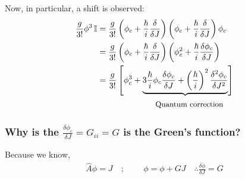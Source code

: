 \documentclass[14pt]{article} %
\begin{document}
Now, in particular, a shift is observed:
\begin{align*}
\frac{g}{3!} \phi^3 \, \mathbb{I}
&= \frac{g}{3!} \left( \phi_c + \frac{\hbar}{i} \frac{\delta}{\delta J} \right)
\left( \phi_c + \frac{\hbar}{i} \frac{\delta}{\delta J} \right) \phi_c
\\
&= \frac{g}{3!} \left( \phi_c + \frac{\hbar}{i} \frac{\delta}{\delta J} \right)
\left( \phi_c^2 + \frac{\hbar}{i} \frac{\delta \phi_c}{\delta J} \right)
\\
&= \frac{g}{3!} \left[ \phi_c^3 + \underbrace{3 \frac{\hbar}{i} \phi_c \frac{\delta \phi_c}{\delta J} + \left( \frac{\hbar}{i} \right)^2 \frac{\delta^2 \phi_c}{\delta J^2}} \right] \\
& \qquad \qquad \qquad \quad\small\text{Quantum correction}
\end{align*}
\begin{tcolorbox}
\subsubsection*{Why is the $\frac{\delta \phi_c}{\delta J} = G_{ii} = G$ is the Green's function?}
Because we know,
\begin{align*}
\hat{A} \phi = J \quad; \quad &~~\phi = \phi + GJ \quad \therefore \frac{\delta \phi}{\delta J} = G
\end{align*}
\end{tcolorbox}
\end{document}
